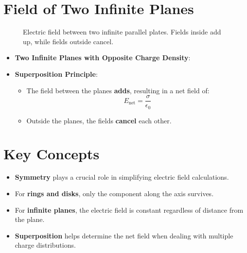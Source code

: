 \documentclass{article}
\begin{document}
\section*{Field of Two Infinite Planes}

\begin{figure}[h!]
    \centering
    \caption{Electric field between two infinite parallel plates. Fields inside add up, while fields outside cancel.}
    \label{fig:parallel_plates_field}
\end{figure}

\begin{itemize}
    \item \textbf{Two Infinite Planes with Opposite Charge Density}:
    \item \textbf{Superposition Principle}:
    \begin{itemize}
        \item The field between the planes \textbf{adds}, resulting in a net field of:
        \[
        E_{\text{net}} = \frac{\sigma}{\epsilon_0}
        \]
        \item Outside the planes, the fields \textbf{cancel} each other.
    \end{itemize}
\end{itemize}

\section*{Key Concepts}
\begin{itemize}
    \item \textbf{Symmetry} plays a crucial role in simplifying electric field calculations.
    \item For \textbf{rings and disks}, only the component along the axis survives.
    \item For \textbf{infinite planes}, the electric field is constant regardless of distance from the plane.
    \item \textbf{Superposition} helps determine the net field when dealing with multiple charge distributions.
\end{itemize}
\end{document}
